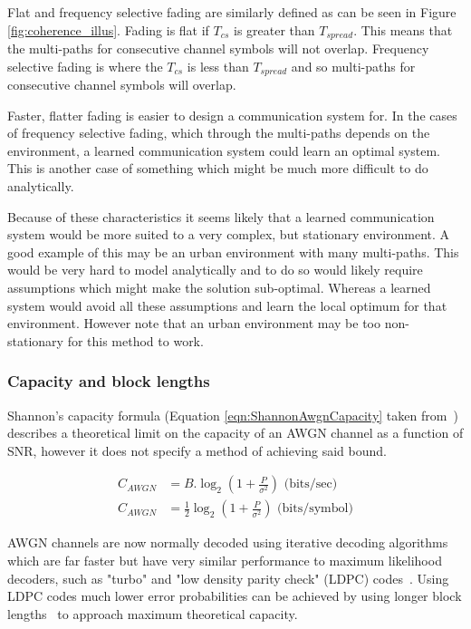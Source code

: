 \documentclass[12pt,onecolumn,letterpaper]{article}
\begin{document}
Flat and frequency selective fading are similarly defined as can be seen in Figure \ref{fig:coherence_illus}. Fading is flat if $T_{cs}$ is greater than $T_{spread}$. This means that the multi-paths for consecutive channel symbols will not overlap. Frequency selective fading is where the $T_{cs}$ is less than $T_{spread}$ and so multi-paths for consecutive channel symbols will overlap.

Faster, flatter fading is easier to design a communication system for. In the cases of frequency selective fading, which through the multi-paths depends on the environment, a learned communication system could learn an optimal system. This is another case of something which might be much more difficult to do analytically.

Because of these characteristics it seems likely that a learned communication system would be more suited to a very complex, but stationary environment. A good example of this may be an urban environment with many multi-paths. This would be very hard to model analytically and to do so would likely require assumptions which might make the solution sub-optimal. Whereas a learned system would avoid all these assumptions and learn the local optimum for that environment. However note that an urban environment may be too non-stationary for this method to work.

\subsubsection{Capacity and block lengths}

Shannon's capacity formula (Equation \ref{eqn:ShannonAwgnCapacity} taken from~\cite{WirelessTextbookC5}) describes a theoretical limit on the capacity of an AWGN channel as a function of SNR, however it does not specify a method of achieving said bound.

\begin{align}
    C_{AWGN} &= B.\log_2(1 + \frac{P}{\sigma^2})  \mbox{    (bits/sec)} \nonumber\\
    C_{AWGN} &= \frac{1}{2} \log_2(1 + \frac{P}{\sigma^2})  \mbox{    (bits/symbol)}
    \label{eqn:ShannonAwgnCapacity}
\end{align}

AWGN channels are now normally decoded using iterative decoding algorithms which are far faster but have very similar performance to maximum likelihood decoders, such as "turbo" and "low density parity check" (LDPC) codes~\cite{WirelessTextbookC5}. Using LDPC codes much lower error probabilities can be achieved by using longer block lengths~\cite{WirelessTextbookC5} to approach maximum theoretical capacity.
\end{document}
